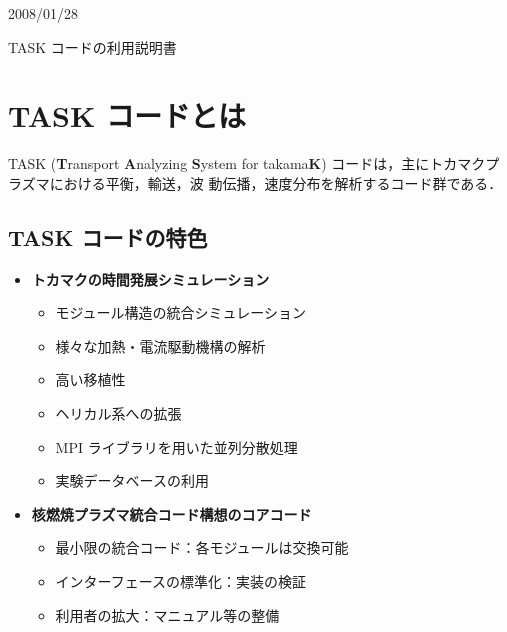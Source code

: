 \documentclass[11pt]{jarticle}
\begin{document}
\begin{flushright}
2008/01/28
\end{flushright}

\begin{center}
{\Large \gt TASK コードの利用説明書}
\end{center}                                   

\section{TASK コードとは}

TASK (\textbf{T}ransport \textbf{A}nalyzing \textbf{S}ystem for
takama\textbf{K}) コードは，主にトカマクプラズマにおける平衡，輸送，波
動伝播，速度分布を解析するコード群である．

\subsection{TASK コードの特色}
\begin{itemize}
\item
\textbf{トカマクの時間発展シミュレーション}
\begin{itemize}
\item
モジュール構造の統合シミュレーション
\item
様々な加熱・電流駆動機構の解析
\item
高い移植性
\item
ヘリカル系への拡張
\item
MPI ライブラリを用いた並列分散処理
\item
実験データベースの利用
\end{itemize}
\item
\textbf{核燃焼プラズマ統合コード構想のコアコード}
\begin{itemize}
\item
最小限の統合コード：各モジュールは交換可能
\item
インターフェースの標準化：実装の検証
\item
利用者の拡大：マニュアル等の整備
\end{itemize}
\end{itemize}
\end{document}
